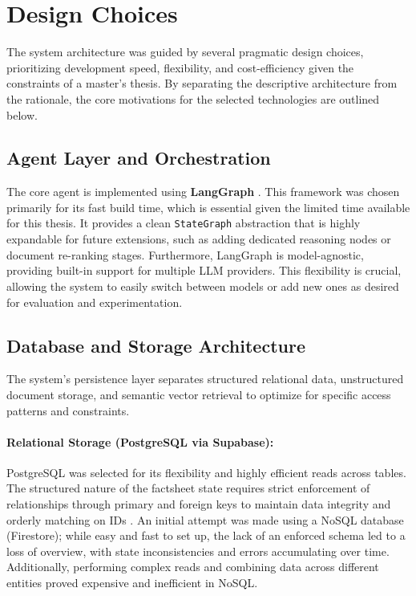 \section{Design Choices}
\label{sec:design-choices}

The system architecture was guided by several pragmatic design choices, prioritizing development speed, flexibility, and cost-efficiency given the constraints of a master's thesis. By separating the descriptive architecture from the rationale, the core motivations for the selected technologies are outlined below.

\subsection{Agent Layer and Orchestration}

The core agent is implemented using \textbf{LangGraph} \cite{langgraph}. This framework was chosen primarily for its fast build time, which is essential given the limited time available for this thesis. It provides a clean \texttt{StateGraph} abstraction that is highly expandable for future extensions, such as adding dedicated reasoning nodes or document re-ranking stages. Furthermore, LangGraph is model-agnostic, providing built-in support for multiple LLM providers. This flexibility is crucial, allowing the system to easily switch between models or add new ones as desired for evaluation and experimentation.

\subsection{Database and Storage Architecture}

The system's persistence layer separates structured relational data, unstructured document storage, and semantic vector retrieval to optimize for specific access patterns and constraints.

\paragraph{Relational Storage (PostgreSQL via Supabase):}
PostgreSQL was selected for its flexibility and highly efficient reads across tables. The structured nature of the factsheet state requires strict enforcement of relationships through primary and foreign keys to maintain data integrity and orderly matching on IDs \cite{supabase}. 
An initial attempt was made using a NoSQL database (Firestore); while easy and fast to set up, the lack of an enforced schema led to a loss of overview, with state inconsistencies and errors accumulating over time. Additionally, performing complex reads and combining data across different entities proved expensive and inefficient in NoSQL. 

